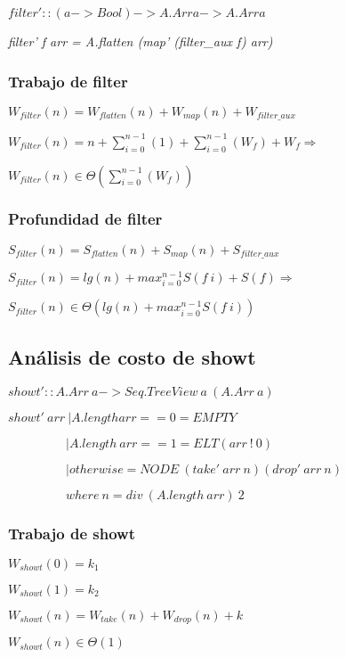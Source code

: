 \documentclass[a4paper,12pt]{article}
\begin{document}
$filter' :: (a -> Bool) -> A.Arr a -> A.Arr a$

\textit{filter' f arr = A.flatten (map' (filter\_aux f) arr)}

\subsubsection{Trabajo de filter}

$W_{filter}(n) = W_{flatten}(n) + W_{map}(n) + W_{filter\_aux}$

$W_{filter} (n) = n + \sum_{i=0}^{n-1}(1) + \sum_{i=0}^{n-1}(W_{f}) + W_{f} \Rightarrow$

$W_{filter}(n) \in \Theta(\sum_{i=0}^{n-1} (W_{f}))$ 

\subsubsection{Profundidad de filter}

$S_{filter}(n) = S_{flatten}(n) + S_{map}(n) + S_{filter\_aux}$

$S_{filter}(n) = lg(n) + max_{i=0}^{n-1} S(f\:i) + S(f) \Rightarrow$

$S_{filter}(n) \in \Theta(lg(n) + max_{i=0}^{n-1} S(f\:i))$

\subsection{Análisis de costo de showt}

$showt' :: A.Arr\: a -> Seq.TreeView\: a\: (A.Arr \:a)$

$showt'\: arr\: | A.length arr == 0 = EMPTY$

$\:\:\:\:\:\:\:\:\:\:\:\:\:\:\:\:\:\:\:\:\:| A.length\: arr == 1 = ELT (arr \:!\: 0) $

$\:\:\:\:\:\:\:\:\:\:\:\:\:\:\:\:\:\:\:\:\:| otherwise = NODE\: (take' \:arr \:n) (drop'\: arr\: n)$

$\:\:\:\:\:\:\:\:\:\:\:\:\:\:\:\:\:\:\:\:\:where\: n = div \:(A.length\: arr)\: 2$

\subsubsection{Trabajo de showt}

$W_{showt}(0) = k_1$

$W_{showt}(1) = k_2$

$W_{showt}(n) = W_{take}(n) + W_{drop}(n) + k$

$W_{showt}(n) \in \Theta(1)$
\end{document}
